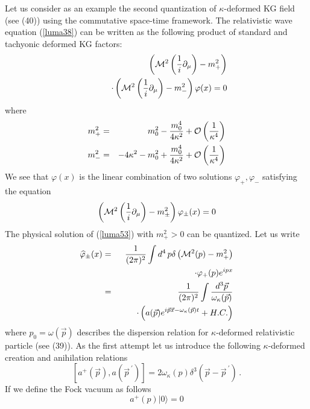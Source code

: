 \documentclass[a4paper,a4paper]{article}
\begin{document}
Let us consider as an example the second quantization of
$\kappa$-deformed KG field
 (see (40))
using the commutative
 space-time framework. The relativistic wave equation
 (\ref{luma38}) can be written
 as the following product of standard and tachyonic deformed
 KG factors:
\begin{eqnarray}\label{luma51}
&&  \left( {\cal M}^{2} \left( {1\over i}\partial_{\mu}\right) -
  m^{2}_{+} \right)
  \cr
&& \qquad
\cdot \left( {\cal M}^{2} \left( {1\over
i}\partial_{\mu}\right) -
  m^{2}_{-} \right)
  \varphi(x) = 0
\end{eqnarray}
where
\begin{eqnarray}\label{luma52}
  m^{2}_{+} & = & m^{2}_{0} -  {m^{4}_{0}\over 4\kappa^{2}} +
  \mathcal{O}
  \left( {1\over \kappa^{4}}\right)
\cr
 m^{2}_{-} & = & -  4\kappa^{2}
  - m^{2}_{0} +  {m^{4}_{0}\over 4\kappa^{2}} + \mathcal{O}
  \left( {1\over \kappa^{4}}\right)
\end{eqnarray}
We see that $\varphi(x)$ is the linear combination of two
solutions $\varphi_{+}, \varphi_{-}$ satisfying the equation
\begin{equation}\label{luma53}
 \left( {\cal M}^{2} \left( {1\over i}\partial_{\mu}\right)
 - m^{2}_{\pm} \right) \varphi_{\pm}(x) = 0
\end{equation}
The physical solution of (\ref{luma53}) with $m^{2}_{+} > 0$ can
be quantized. Let us write
\begin{eqnarray}\label{luma54}
  \widehat{\varphi}_{\pm}(x)
 & =&  {1\over (2\pi)^{2}}
  \int d^{4}\, p \delta
\left( {\cal M}^{2}(p)
 - m^{2}_{+} \right)
 \cr
  && \qquad \qquad \qquad  \qquad \cdot  \varphi_{+}(p)e^{ipx}
\cr
 &= & {1\over (2\pi)^{2}} \int
 { d^{3} \vec{p}\over
 \omega_{\kappa}(\vec{p}) }
 \cr
 && \qquad        \cdot
 \left( a ( \vec{p}) e^{i
 \vec{p}\vec{x} - \omega_{\kappa}
( \vec{p}) t} + H.C. \right)
\end{eqnarray}
where
 $p_{0}=\omega(\vec{p})$
 describes the dispersion relation for
$\kappa$-deformed relativistic particle (see (39)).
As the first attempt let us introduce the
following $\kappa$-deformed creation and anihilation relations
\begin{equation}\label{luma55}
  \left[ a^{+}(\vec{p}), a(\vec{p}^{\ \prime})\right]
  = 2\omega_{\kappa}(p) \delta^{3}
  (\vec{p} - \vec{p}^{\ \prime} )\, .
\end{equation}
If we define the Fock vacuum
as follows
\begin{equation}\label{luma56}
  a^{+}(p) | 0\rangle = 0
\end{equation}
\end{document}
